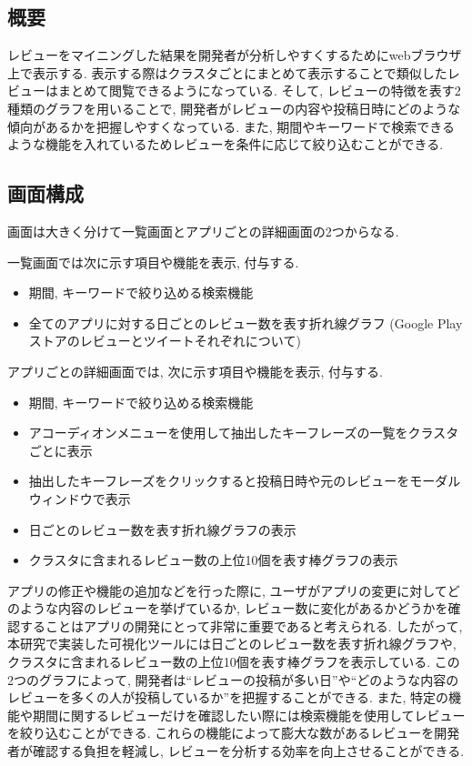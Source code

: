 \subsection{概要}
レビューをマイニングした結果を開発者が分析しやすくするためにwebブラウザ上で表示する. 表示する際はクラスタごとにまとめて表示することで類似したレビューはまとめて閲覧できるようになっている. 
そして, レビューの特徴を表す2種類のグラフを用いることで, 開発者がレビューの内容や投稿日時にどのような傾向があるかを把握しやすくなっている. また, 期間やキーワードで検索できるような機能を入れているためレビューを条件に応じて絞り込むことができる. 

\subsection{画面構成}
画面は大きく分けて一覧画面とアプリごとの詳細画面の2つからなる. 

一覧画面では次に示す項目や機能を表示, 付与する. 

\begin{itemize}
  \item 期間, キーワードで絞り込める検索機能
  \item 全てのアプリに対する日ごとのレビュー数を表す折れ線グラフ (Google Playストアのレビューとツイートそれぞれについて)
\end{itemize}

アプリごとの詳細画面では, 次に示す項目や機能を表示, 付与する.

\begin{itemize}
  \item 期間, キーワードで絞り込める検索機能
  \item アコーディオンメニューを使用して抽出したキーフレーズの一覧をクラスタごとに表示
  \item 抽出したキーフレーズをクリックすると投稿日時や元のレビューをモーダルウィンドウで表示
  \item 日ごとのレビュー数を表す折れ線グラフの表示
  \item クラスタに含まれるレビュー数の上位10個を表す棒グラフの表示
\end{itemize}

アプリの修正や機能の追加などを行った際に, ユーザがアプリの変更に対してどのような内容のレビューを挙げているか, レビュー数に変化があるかどうかを確認することはアプリの開発にとって非常に重要であると考えられる. 
したがって, 本研究で実装した可視化ツールには日ごとのレビュー数を表す折れ線グラフや, クラスタに含まれるレビュー数の上位10個を表す棒グラフを表示している. 
この2つのグラフによって, 開発者は``レビューの投稿が多い日''や``どのような内容のレビューを多くの人が投稿しているか''を把握することができる. 
また, 特定の機能や期間に関するレビューだけを確認したい際には検索機能を使用してレビューを絞り込むことができる. 
これらの機能によって膨大な数があるレビューを開発者が確認する負担を軽減し, レビューを分析する効率を向上させることができる. 

